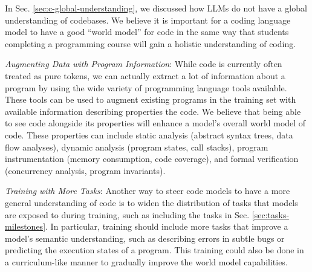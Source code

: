 

In Sec. \ref{sec:c-global-understanding}, we discussed how LLMs do not have a global understanding of codebases. We believe it is important for a coding language model to have a good ``world model'' for code in the same way that students completing a programming course will gain a holistic understanding of coding. 


\textit{Augmenting Data with Program Information}: While code is currently often treated as pure tokens, we can actually extract a lot of information about a program by using the wide variety of programming language tools available. These tools can be used to augment existing programs in the training set with available information describing properties the code. We believe that being able to see code alongside its properties will enhance a model's overall world model of code. These properties can include static analysis (abstract syntax trees, data flow analyses), dynamic analysis (program states, call stacks), program instrumentation (memory consumption, code coverage), and formal verification (concurrency analysis, program invariants).



\textit{Training with More Tasks}: Another way to steer code models to have a more general understanding of code is to widen the distribution of tasks that models are exposed to during training, such as including the tasks in Sec. \ref{sec:tasks-milestones}. In particular, training should include more tasks that improve a model's semantic understanding, such as describing errors in subtle bugs or predicting the execution states of a program. This training could also be done in a curriculum-like manner to gradually improve the world model capabilities.

